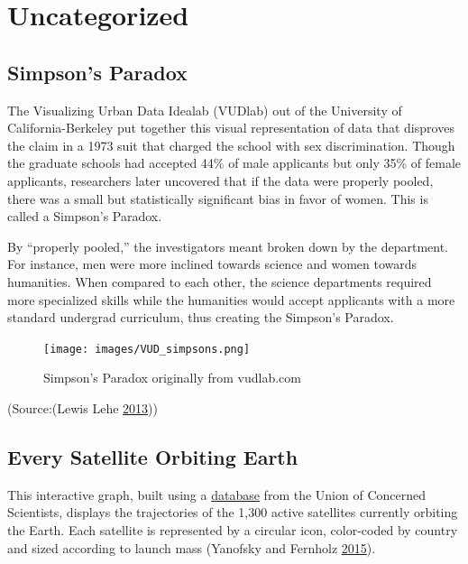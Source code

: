 \documentclass[]{book}
\begin{document}
\hypertarget{uncategorized}{%
\section{Uncategorized}\label{uncategorized}}

\hypertarget{simpsons-paradox}{%
\subsection{Simpson's Paradox}\label{simpsons-paradox}}

The Visualizing Urban Data Idealab (VUDlab) out of the University of California-Berkeley put together this visual representation of data that disproves the claim in a 1973 suit that charged the school with sex discrimination. Though the graduate schools had accepted 44\% of male applicants but only 35\% of female applicants, researchers later uncovered that if the data were properly pooled, there was a small but statistically significant bias in favor of women. This is called a Simpson's Paradox.

By ``properly pooled,'' the investigators meant broken down by the department. For instance, men were more inclined towards science and women towards humanities. When compared to each other, the science departments required more specialized skills while the humanities would accept applicants with a more standard undergrad curriculum, thus creating the Simpson's Paradox.

\begin{figure}
\centering
\texttt{[image: images/VUD\_simpsons.png]}
\caption{Simpson's Paradox originally from vudlab.com}
\end{figure}

(Source:(Lewis Lehe \protect\hyperlink{ref-simpson_paradox}{2013}))

\hypertarget{every-satellite-orbiting-earth}{%
\subsection{Every Satellite Orbiting Earth}\label{every-satellite-orbiting-earth}}

This interactive graph, built using a \href{https://www.ucsusa.org/nuclear-weapons/space-weapons/satellite-database\#.WxbaMVMvzq1}{database} from the Union of Concerned Scientists, displays the trajectories of the 1,300 active satellites currently orbiting the Earth. Each satellite is represented by a circular icon, color-coded by country and sized according to launch mass (Yanofsky and Fernholz \protect\hyperlink{ref-Satellite}{2015}).
\end{document}
